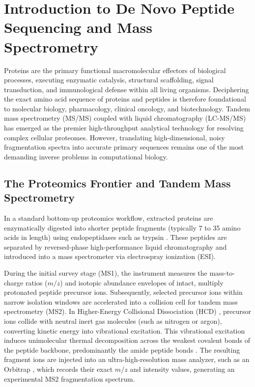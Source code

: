\chapter{Introduction to De Novo Peptide Sequencing and Mass Spectrometry}

Proteins are the primary functional macromolecular effectors of biological processes, executing enzymatic catalysis, structural scaffolding, signal transduction, and immunological defense within all living organisms. Deciphering the exact amino acid sequence of proteins and peptides is therefore foundational to molecular biology, pharmacology, clinical oncology, and biotechnology. Tandem mass spectrometry (MS/MS) coupled with liquid chromatography (LC-MS/MS) has emerged as the premier high-throughput analytical technology for resolving complex cellular proteomes. However, translating high-dimensional, noisy fragmentation spectra into accurate primary sequences remains one of the most demanding inverse problems in computational biology.

\section{The Proteomics Frontier and Tandem Mass Spectrometry}

In a standard bottom-up proteomics workflow, extracted proteins are enzymatically digested into shorter peptide fragments (typically 7 to 35 amino acids in length) using endopeptidases such as trypsin \citep{Olsen2004, Vandermarliere2013}. These peptides are separated by reversed-phase high-performance liquid chromatography and introduced into a mass spectrometer via electrospray ionization (ESI). 

During the initial survey stage (MS1), the instrument measures the mass-to-charge ratios ($m/z$) and isotopic abundance envelopes of intact, multiply protonated peptide precursor ions. Subsequently, selected precursor ions within narrow isolation windows are accelerated into a collision cell for tandem mass spectrometry (MS2). In Higher-Energy Collisional Dissociation (HCD) \citep{Olsen2007}, precursor ions collide with neutral inert gas molecules (such as nitrogen or argon), converting kinetic energy into vibrational excitation. This vibrational excitation induces unimolecular thermal decomposition across the weakest covalent bonds of the peptide backbone, predominantly the amide peptide bonds \citep{Paizs2005}. The resulting fragment ions are injected into an ultra-high-resolution mass analyzer, such as an Orbitrap \citep{Makarov2000, Zubarev2007}, which records their exact $m/z$ and intensity values, generating an experimental MS2 fragmentation spectrum.

